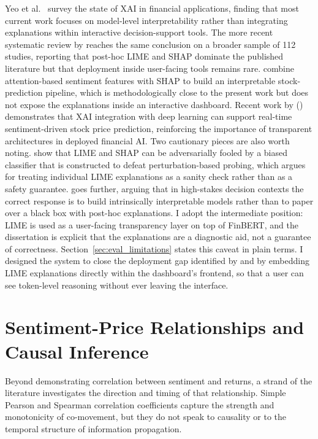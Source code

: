 Yeo et al.\ \citep{yeo2023xai} survey the state of XAI in financial applications, finding that most current work focuses on model-level interpretability rather than integrating explanations within interactive decision-support tools. The more recent systematic review by \citet{biswas2024xai} reaches the same conclusion on a broader sample of 112 studies, reporting that post-hoc LIME and SHAP dominate the published literature but that deployment inside user-facing tools remains rare. \citet{chen2023interpretable} combine attention-based sentiment features with SHAP to build an interpretable stock-prediction pipeline, which is methodologically close to the present work but does not expose the explanations inside an interactive dashboard. Recent work by \citeauthor{bala2025integration} (\citeyear{bala2025integration}) demonstrates that XAI integration with deep learning can support real-time sentiment-driven stock price prediction, reinforcing the importance of transparent architectures in deployed financial AI. Two cautionary pieces are also worth noting. \citet{slack2020fooling} show that LIME and SHAP can be adversarially fooled by a biased classifier that is constructed to defeat perturbation-based probing, which argues for treating individual LIME explanations as a sanity check rather than as a safety guarantee. \citet{rudin2019stop} goes further, arguing that in high-stakes decision contexts the correct response is to build intrinsically interpretable models rather than to paper over a black box with post-hoc explanations. I adopt the intermediate position: LIME is used as a user-facing transparency layer on top of FinBERT, and the dissertation is explicit that the explanations are a diagnostic aid, not a guarantee of correctness. Section~\ref{sec:eval_limitations} states this caveat in plain terms. I designed the system to close the deployment gap identified by \citeauthor{yeo2023xai} and \citeauthor{biswas2024xai} by embedding LIME explanations directly within the dashboard's frontend, so that a user can see token-level reasoning without ever leaving the interface.

\section{Sentiment-Price Relationships and Causal Inference}

Beyond demonstrating correlation between sentiment and returns, a strand of the literature investigates the direction and timing of that relationship.  Simple Pearson and Spearman correlation coefficients capture the strength and monotonicity of co-movement, but they do not speak to causality or to the temporal structure of information propagation.

